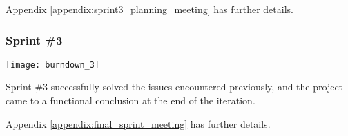 Appendix \ref{appendix:sprint3_planning_meeting} has further details.

\subsubsection{Sprint \#3}

\begin{center}
	\texttt{[image: burndown\_3]}
	\label{figure:burndown_3}
\end{center}

Sprint \#3 successfully solved the issues encountered previously, and the project came to a functional conclusion at the end of the iteration.

Appendix \ref{appendix:final_sprint_meeting} has further details.